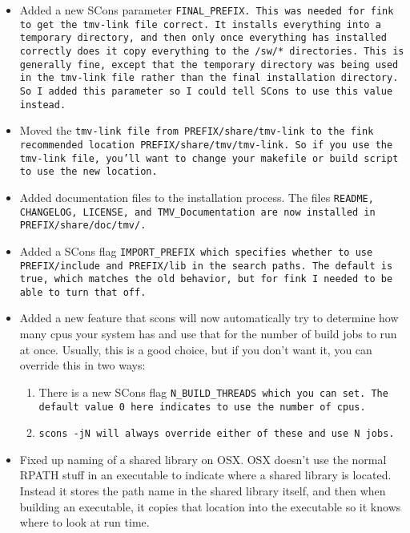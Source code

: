 \begin{itemize}

\item
Added a new SCons parameter \tt{FINAL\_PREFIX}.  This was needed for fink to 
get the \tt{tmv-link} file correct.  It installs everything into a temporary
directory, and then only once everything has installed correctly does
it copy everything to the \tt{/sw/*} directories.  This is generally fine,
except that the temporary directory was being used in the \tt{tmv-link}
file rather than the final installation directory.  So I added this
parameter so I could tell SCons to use this value instead.

\item
Moved the \tt{tmv-link} file from \tt{PREFIX/share/tmv-link} to the fink 
recommended location \tt{PREFIX/share/tmv/tmv-link}.  So if you use the 
\tt{tmv-link} file, you'll want to change your makefile or build script to 
use the new location.

\item
Added documentation files to the installation process.  The files \tt{README},
\tt{CHANGELOG}, \tt{LICENSE}, and \tt{TMV\_Documentation} are now installed in
\tt{PREFIX/share/doc/tmv/}.

\item
Added a SCons flag \tt{IMPORT\_PREFIX} which specifies whether to use 
\tt{PREFIX/include} and \tt{PREFIX/lib} in the search paths.  The default is true,
which matches the old behavior, but for fink I needed to be able to 
turn that off.

\item
Added a new feature that scons will now automatically try to determine 
how many cpus your system has and use that for the number of build jobs 
to run at once.  Usually, this is a good choice, but if you don't want
it, you can override this in two ways:

\begin{enumerate}
\item There is a new SCons flag \tt{N\_BUILD\_THREADS} which you can set.
The default value 0 here indicates to use the number of cpus.

\item \tt{scons -jN} will always override either of these and use N jobs.
\end{enumerate}

\item
Fixed up naming of a shared library on OSX.  OSX doesn't use the normal
RPATH stuff in an executable to indicate where a shared library is located.
Instead it stores the path name in the shared library itself, and then
when building an executable, it copies that location into the executable
so it knows where to look at run time.


\end{itemize}
